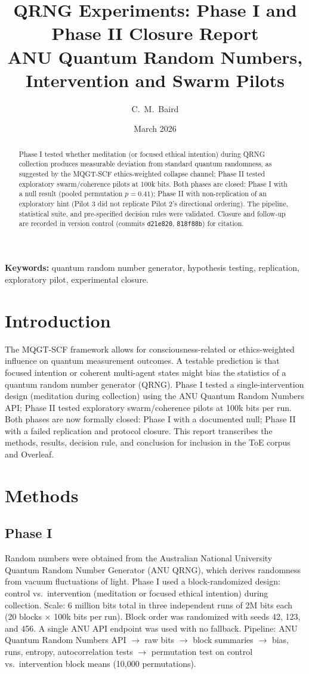 \documentclass[reprint,amsmath,amssymb,aps,showkeys]{revtex4-2}
\title{QRNG Experiments: Phase I and Phase II Closure Report\\
ANU Quantum Random Numbers, Intervention and Swarm Pilots}
\author{C.~M.~Baird}
\affiliation{Baird--ZoraASI Collaboration}
\date{March 2026}
\begin{document}
\maketitle

\begin{abstract}
Phase I tested whether meditation (or focused ethical intention) during QRNG collection produces measurable deviation from standard quantum randomness, as suggested by the MQGT-SCF ethics-weighted collapse channel; Phase II tested exploratory swarm/coherence pilots at 100k bits. Both phases are closed: Phase I with a null result (pooled permutation $p = 0.41$); Phase II with non-replication of an exploratory hint (Pilot 3 did not replicate Pilot 2's directional ordering). The pipeline, statistical suite, and pre-specified decision rules were validated. Closure and follow-up are recorded in version control (commits \texttt{d21e820}, \texttt{818f88b}) for citation.
\end{abstract}

\noindent\textbf{Keywords:} quantum random number generator, hypothesis testing, replication, exploratory pilot, experimental closure.

\section{Introduction}

The MQGT-SCF framework allows for consciousness-related or ethics-weighted influence on quantum measurement outcomes. A testable prediction is that focused intention or coherent multi-agent states might bias the statistics of a quantum random number generator (QRNG). Phase I tested a single-intervention design (meditation during collection) using the ANU Quantum Random Numbers API; Phase II tested exploratory swarm/coherence pilots at 100k bits per run. Both phases are now formally closed: Phase I with a documented null; Phase II with a failed replication and protocol closure. This report transcribes the methods, results, decision rule, and conclusion for inclusion in the ToE corpus and Overleaf.

\section{Methods}

\subsection{Phase I}
Random numbers were obtained from the Australian National University Quantum Random Number Generator (ANU QRNG), which derives randomness from vacuum fluctuations of light. Phase I used a block-randomized design: control vs.\ intervention (meditation or focused ethical intention) during collection. Scale: 6 million bits total in three independent runs of 2M bits each (20 blocks $\times$ 100k bits per run). Block order was randomized with seeds 42, 123, and 456. A single ANU API endpoint was used with no fallback. Pipeline: ANU Quantum Random Numbers API $\to$ raw bits $\to$ block summaries $\to$ bias, runs, entropy, autocorrelation tests $\to$ permutation test on control vs.\ intervention block means (10,000 permutations).
\end{document}
